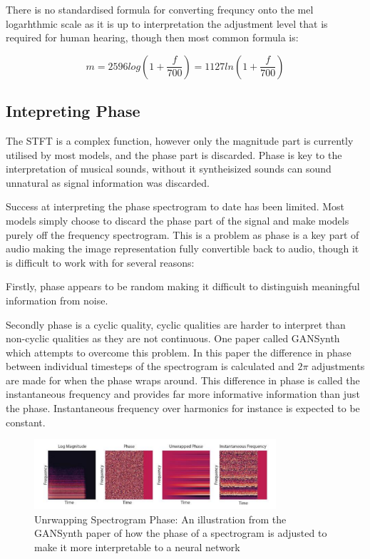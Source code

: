 There is no standardised formula for converting frequncy onto the mel logarhthmic scale as it is up to interpretation the adjustment level that is required for human hearing, though then most common formula is\cite{SpeechCommunication}:

\begin{equation}
    m = 2596 log(1 +  \frac{f}{700}) = 1127 ln (1 + \frac{f}{700})
\end{equation}

\subsection{Intepreting Phase}

The STFT is a complex function, however only the magnitude part is currently utilised by most models, and the phase part is discarded. Phase is key to the interpretation of musical sounds, without it syntheisized sounds can sound unnatural as signal information was discarded.

Success at interpreting the phase spectrogram to date has been limited. Most models simply choose to discard the phase part of the signal and make models purely off the frequency spectrogram. This is a problem as phase is a key part of audio making the image representation fully convertible back to audio, though it is difficult to work with for several reasons:

Firstly, phase appears to be random making it difficult to distinguish meaningful information from noise.

Secondly phase is a cyclic quality, cyclic qualities are harder to interpret than non-cyclic qualities as they are not continuous. One paper called GANSynth\cite{GANSynth} which attempts to overcome this problem. In this paper the difference in phase between individual timesteps of the spectrogram is calculated and $2\pi$ adjustments are made for when the phase wraps around. This difference in phase is called the instantaneous frequency and provides far more informative information than just the phase. Instantaneous frequency over harmonics for instance is expected to be constant.

\begin{figure}[!ht]
    \centering
    \includegraphics[width=0.8\textwidth]{literature_review/PhaseAdjustment.png}
    \caption{Unrwapping Spectrogram Phase: An illustration from the GANSynth paper of how the phase of a spectrogram is adjusted to make it more interpretable to a neural network\cite{GANSynth}}
    \label{fig:phase_unwrapping}
\end{figure}

